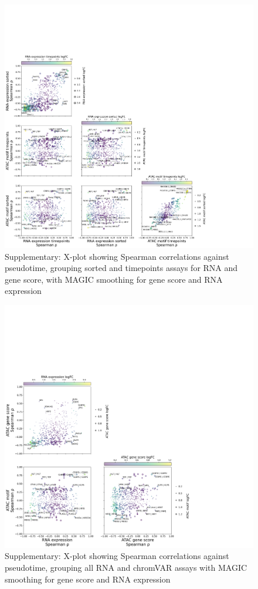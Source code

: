 \documentclass[a4paper]{article}
\begin{document}
\begin{figure}[!htb]
  \centering
  \includegraphics[width=\textwidth]{../figures/hematopoiesis/Monocyte_40_15_smooth_magic_semi_detailed_X_plot.png}
  \caption{Supplementary: X-plot showing Spearman correlations against pseudotime, grouping sorted and timepoints assays for RNA and gene score, with MAGIC smoothing for gene score and RNA expression}
\end{figure}

\begin{figure}[!htb]
  \centering
  \includegraphics[width=\textwidth]{../figures/hematopoiesis/Monocyte_40_15_smooth_magic_grouped_X_plot.png}
  \caption{Supplementary: X-plot showing Spearman correlations against pseudotime, grouping all RNA and chromVAR assays with MAGIC smoothing for gene score and RNA expression}
\end{figure}
\end{document}
